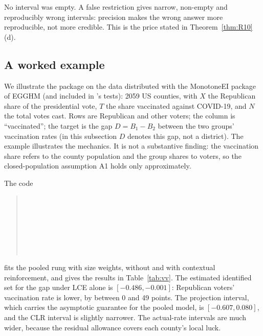 No interval was empty. A false restriction gives narrow, non-empty and reproducibly
wrong intervals: precision makes the wrong answer more reproducible, not more
credible. This is the price stated in Theorem~\ref{thm:R10}(d).

\subsection{A worked example}\label{sec:example}

We illustrate the package on the  data distributed with the
MonotoneEI package of EGGHM (and included in 's tests): 2059 US
counties, with $X$ the Republican share of the presidential vote, $T$ the share
vaccinated against COVID-19, and $N$ the total votes cast. Rows are Republican and
other voters; the column is ``vaccinated''; the target is the gap $D=B_1-B_2$ between the two
groups' vaccination rates (in this subsection $D$ denotes this gap, not a district). The example illustrates the mechanics. It is not a
substantive finding: the vaccination share refers to the county population and the
group shares to voters, so the closed-population assumption A1 holds only
approximately.

The code
\begin{quote}\small
{}\\
\\
\\
\\
\\
\\
\end{quote}
fits the pooled rung with size weights, without and with contextual reinforcement,
and gives the results in Table~\ref{tab:vv}. The estimated identified set for
the gap under LCE alone is $[-0.486,-0.001]$: Republican voters' vaccination rate is
lower, by between 0 and 49 points. The projection interval, which carries the
asymptotic guarantee for the pooled model, is $[-0.607,0.080]$, and the CLR interval
is slightly narrower. The actual-rate intervals are much wider, because the residual
allowance covers each county's local luck.

